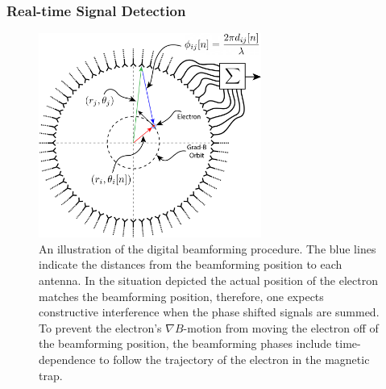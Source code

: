 

\subsubsection{Real-time Signal Detection}
\label{sec:bf-and-stft}

\begin{figure}[htbp]
    \centering
    \includegraphics[width=0.65\textwidth]{figs/Chapter-4/230803_beamforming_diagram.png}
    \caption{An illustration of the digital beamforming procedure. The blue lines indicate the distances from the beamforming position to each antenna. In the situation depicted the actual position of the electron matches the beamforming position, therefore, one expects constructive interference when the phase shifted signals are summed. To prevent the electron's $\nabla B$-motion from moving the electron off of the beamforming position, the beamforming phases include time-dependence to follow the trajectory of the electron in the magnetic trap.}
    \label{fig:beamforming}
\end{figure}

